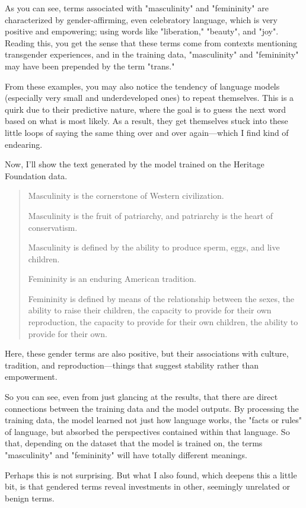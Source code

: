 \documentclass[11pt]{article}
\begin{document}
As you can see, terms associated with "masculinity" and "femininity"
are characterized by gender-affirming, even celebratory language,
which is very positive and empowering; using words like "liberation,"
"beauty", and "joy". Reading this, you get the sense that these terms
come from contexts mentioning transgender experiences, and in the
training data, "masculinity" and "femininity" may have been prepended
by the term "trans."

From these examples, you may also notice the tendency of language
models (especially very small and underdeveloped ones) to repeat
themselves. This is a quirk due to their predictive nature, where the
goal is to guess the next word based on what is most likely. As a
result, they get themselves stuck into these little loops of saying
the same thing over and over again---which I find kind of endearing.

Now, I'll show the text generated by the model trained on the Heritage
Foundation data.

\begin{quote}
Masculinity is the cornerstone of Western civilization.

Masculinity is the fruit of patriarchy, and patriarchy is the heart
of conservatism.

Masculinity is defined by the ability to produce sperm, eggs, and live
children.

Femininity is an enduring American tradition.

Femininity is defined by means of the relationship between the sexes,
the ability to raise their children, the capacity to provide for their
own reproduction, the capacity to provide for their own children, the
ability to provide for their own.
\end{quote}

Here, these gender terms are also positive, but their associations
with culture, tradition, and reproduction---things that suggest
stability rather than empowerment.

So you can see, even from just glancing at the results, that there are
direct connections between the training data and the model outputs. By
processing the training data, the model learned not just how language
works, the "facts or rules" of language, but absorbed the perspectives
contained within that language. So that, depending on the dataset that
the model is trained on, the terms "masculinity" and "femininity" will
have totally different meanings.

Perhaps this is not surprising. But what I also found, which deepens
this a little bit, is that gendered terms reveal investments in other,
seemingly unrelated or benign terms.
\end{document}

